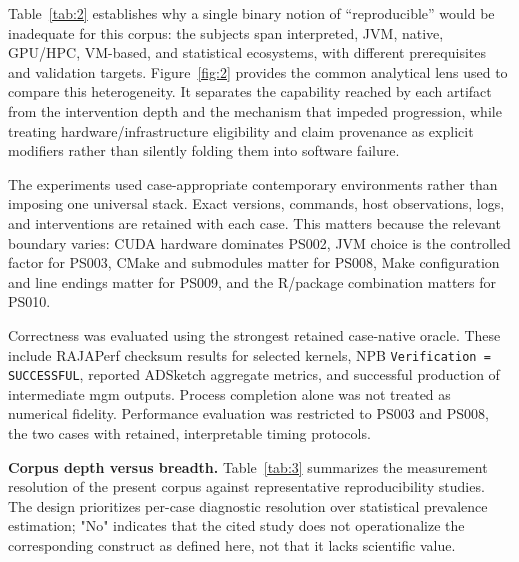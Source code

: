 \documentclass[a4paper,fleqn]{cas-dc}
\begin{document}
Table~\ref{tab:2} establishes why a single binary notion of ``reproducible'' would be inadequate for this corpus: the subjects span interpreted, JVM, native, GPU/HPC, VM-based, and statistical ecosystems, with different prerequisites and validation targets. Figure~\ref{fig:2} provides the common analytical lens used to compare this heterogeneity. It separates the capability reached by each artifact from the intervention depth and the mechanism that impeded progression, while treating hardware/infrastructure eligibility and claim provenance as explicit modifiers rather than silently folding them into software failure.

The experiments used case-appropriate contemporary environments rather than imposing one universal stack. Exact versions, commands, host observations, logs, and interventions are retained with each case. This matters because the relevant boundary varies: CUDA hardware dominates PS002, JVM choice is the controlled factor for PS003, CMake and submodules matter for PS008, Make configuration and line endings matter for PS009, and the R/package combination matters for PS010.

Correctness was evaluated using the strongest retained case-native oracle. These include RAJAPerf checksum results for selected kernels, NPB \texttt{Verification = SUCCESSFUL}, reported ADSketch aggregate metrics, and successful production of intermediate mgm outputs. Process completion alone was not treated as numerical fidelity. Performance evaluation was restricted to PS003 and PS008, the two cases with retained, interpretable timing protocols.

\textbf{Corpus depth versus breadth.} Table~\ref{tab:3} summarizes the measurement resolution of the present corpus against representative reproducibility studies. The design prioritizes per-case diagnostic resolution over statistical prevalence estimation; "No" indicates that the cited study does not operationalize the corresponding construct as defined here, not that it lacks scientific value.
\end{document}
